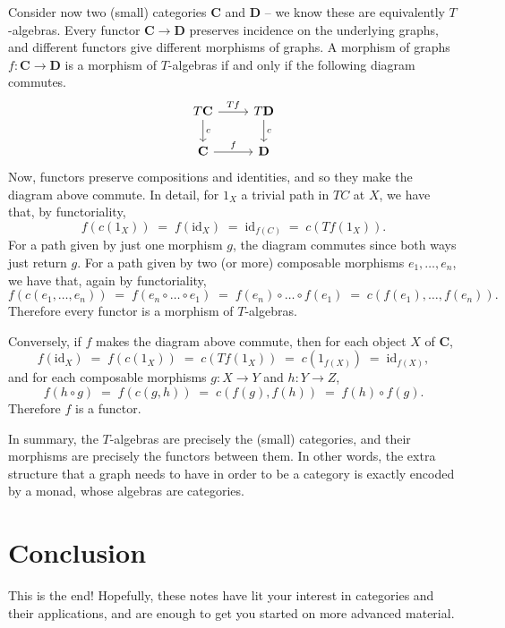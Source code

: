 \documentclass[a4paper,11pt,oneside]{scrbook}
\makeatletter
\newcommand*{\currentname}{\@currentlabelname}
\numberwithin{equation}{section}
\theoremstyle{plain}
\theoremstyle{definition}
\newcommand{\cat}[1]{{\mathbf{#1}}} %
\newcommand{\ar}[2][]{\arrow{#2}{#1}}
\DeclareMathOperator{\1}{\mathbbm{1}}
\DeclareMathOperator{\2}{\mathbbm{2}}
\newcommand{\id}{\mathrm{id}} %
\makeatother
\begin{document}
 Consider now two (small) categories $\cat{C}$ and $\cat{D}$ -- we know these are equivalently $T$-algebras. Every functor $\cat{C}\to\cat{D}$ preserves incidence on the underlying graphs, and different functors give different morphisms of graphs. A morphism of graphs $f:\cat{C}\to\cat{D}$ is a morphism of $T$-algebras if and only if the following diagram commutes.
 $$
 \begin{tikzcd}
  T\cat{C} \ar{d}{c} \ar{r}{Tf} & T\cat{D} \ar{d}{c} \\
  \cat{C} \ar{r}{f} & \cat{D}
 \end{tikzcd}
 $$
 Now, functors preserve compositions and identities, and so they make the diagram above commute. In detail, for $1_X$ a trivial path in $TC$ at $X$, we have that, by functoriality,
 $$
 f(c(1_X)) \;=\; f(\id_X) \;=\; \id_{f(C)} \;=\; c(Tf(1_X)).
 $$
 For a path given by just one morphism $g$, the diagram commutes since both ways just return $g$.
 For a path given by two (or more) composable morphisms $e_1,\dots,e_n$, we have that, again by functoriality,
 $$
 f(c(e_1,\dots,e_n)) \;=\; f(e_n\circ\dots\circ e_1) \;=\;f(e_n)\circ\dots\circ f(e_1) \;=\; c(f(e_1),\dots,f(e_n)) .
 $$
 Therefore every functor is a morphism of $T$-algebras.
 
 Conversely, if $f$ makes the diagram above commute, then for each object $X$ of $\cat{C}$,
 $$
 f(\id_X) \;=\; f(c(1_X)) \;=\; c(Tf(1_X)) \;=\; c(1_{f(X)}) \;=\; \id_{f(X)} ,
 $$
 and for each composable morphisms $g:X\to Y$ and $h:Y\to Z$, 
 $$
 f(h\circ g) \;=\; f(c(g,h)) \;=\; c(f(g),f(h)) \;=\; f(h) \circ f(g) .
 $$
 Therefore $f$ is a functor. 
 
 In summary, the $T$-algebras are precisely the (small) categories, and their morphisms are precisely the functors between them. In other words, the extra structure that a graph needs to have in order to be a category is exactly encoded by a monad, whose algebras are categories.




\newpage
\chapter*{Conclusion}
\addcontentsline{toc}{chapter}{\currentname}


This is the end!  Hopefully, these notes have lit your interest in categories and their applications, and are enough to get you started on more advanced material. 
\end{document}
